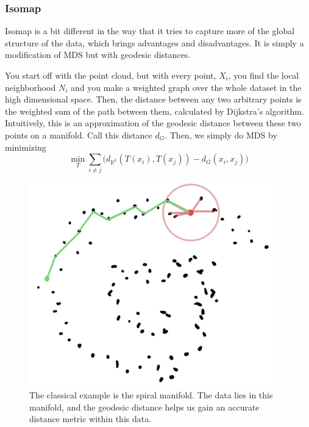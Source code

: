 \documentclass{article}
\begin{document}
    \subsubsection{Isomap} 

      Isomap is a bit different in the way that it tries to capture more of the global structure of the data, which brings advantages and disadvantages. It is simply a modification of MDS but with geodesic distances. 

      \begin{definition}[Isomap]
        You start off with the point cloud, but with every point, $X_i$, you find the local neighborhood $N_i$ and you make a weighted graph over the whole dataset in the high dimensional space. Then, the distance between any two arbitrary points is the weighted sum of the path between them, calculated by Dijkstra's algorithm. Intuitively, this is an approximation of the geodesic distance between these two points on a manifold. Call this distance $d_G$. Then, we simply do MDS by minimizing 
        \begin{equation}
          \min_{T} \sum_{i \neq j} \big( d_{\mathbb{R}^k}(T(x_i), T(x_j)) - d_G(x_i, x_j) \big)
        \end{equation}

        \begin{figure}[H]
          \centering 
          \includegraphics[scale=0.4]{img/isomap.png}
          \caption{The classical example is the spiral manifold. The data lies in this manifold, and the geodesic distance helps us gain an accurate distance metric within this data. } 
          \label{fig:isomap}
        \end{figure}
      \end{definition}
\end{document}
